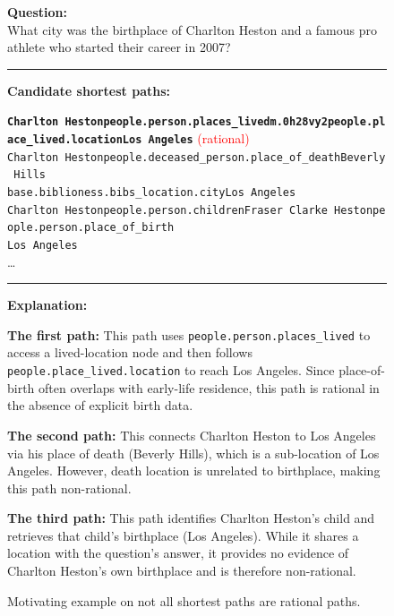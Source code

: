 \begin{figure}[t]
\begin{tcolorbox}[colback=gray!5!white,
                  colframe=gray!75!black,
                  title=WebQTrn-3548\_c352f5de0efe2369ee74ef2a99973561]
\scriptsize

\textbf{Question:}\\
What city was the birthplace of Charlton Heston and a famous pro athlete who started their career in 2007?

\rule{\linewidth}{0.4pt}

\textbf{Candidate shortest paths:}\\[2pt]
{\raggedright
\texttt{\textbf{Charlton Heston\patharrow people.person.places\_lived\patharrow m.0h28vy2\patharrow people.place\_lived.location\patharrow Los Angeles}}\hfill
\textcolor{red}{(rational)}\\[6pt]

\texttt{Charlton Heston\patharrow people.deceased\_person.place\_of\_death\patharrow Beverly Hills \\ \patharrow base.biblioness.bibs\_location.city\patharrow Los Angeles}\\[6pt]

\texttt{Charlton Heston\patharrow people.person.children\patharrow Fraser Clarke Heston\patharrow people.person.place\_of\_birth \\ \patharrow Los Angeles}\\[6pt]

\ldots %
\par}

\rule{\linewidth}{0.4pt}

\textbf{Explanation:}\\[2pt]
{\raggedright
\textbf{The first path:} This path uses \texttt{people.person.places\_lived} to access a lived-location node and then follows \texttt{people.place\_lived.location} to reach Los Angeles. Since place-of-birth often overlaps with early-life residence, this path is rational in the absence of explicit birth data.\par\vspace{6pt}

\textbf{The second path:} This connects Charlton Heston to Los Angeles via his place of death (Beverly Hills), which is a sub-location of Los Angeles. However, death location is unrelated to birthplace, making this path non-rational.\par\vspace{6pt}

\textbf{The third path:} This path identifies Charlton Heston’s child and retrieves that child’s birthplace (Los Angeles). While it shares a location with the question's answer, it provides no evidence of Charlton Heston’s own birthplace and is therefore non-rational.\par}

\end{tcolorbox}
\caption{Motivating example on not all shortest paths are rational paths.}
\label{fig:type1_no5}
\end{figure}

